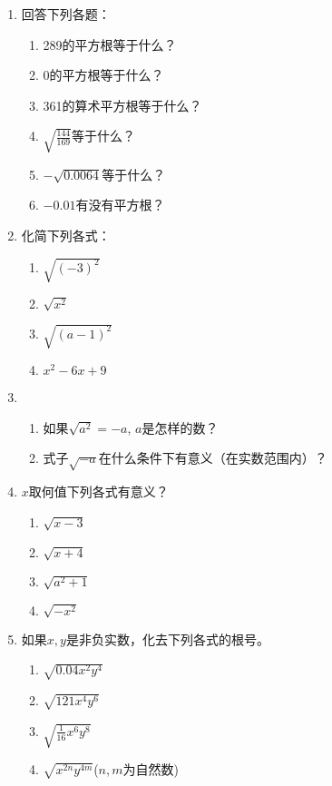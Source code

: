 \begin{ex}
\begin{enumerate}
    \item 回答下列各题：
    \begin{enumerate}
    \item 289的平方根等于什么？
    \item 0的平方根等于什么？
    \item 361的算术平方根等于什么？
    \item $\sqrt{\frac{144}{169}}$等于什么？
    \item $-\sqrt{0.0064}$等于什么？
    \item $-0.01$有没有平方根？
\end{enumerate}



\item 化简下列各式：
\begin{multicols}{2}
    \begin{enumerate}
    \item $\sqrt{(-3)^2}$
    \item $\sqrt{x^2}$
    \item $\sqrt{(a-1)^2}$
    \item $x^2-6x+9$
\end{enumerate}
\end{multicols}



\item 
\begin{enumerate}
    \item 如果$\sqrt{a^2}=-a$, $a$是怎样的数？
    \item 式子$\sqrt{-a}$在什么条件下有意义（在实数范围内）？
\end{enumerate}


\item $x$取何值下列各式有意义？
\begin{multicols}{2}
  \begin{enumerate}
    \item $\sqrt{x-3}$
    \item $\sqrt{x+4}$
    \item $\sqrt{a^2+1}$
    \item $\sqrt{-x^2}$
\end{enumerate}  
\end{multicols}


\item 如果$x,y$是非负实数，化去下列各式的根号。
\begin{enumerate}
    \item $\sqrt{0.04x^2y^4}$
    \item $\sqrt{121x^4y^6}$
    \item $\sqrt{\frac{1}{16}x^6y^8}$
    \item $\sqrt{x^{2n}y^{4m}}$\quad ($n,m$为自然数)
\end{enumerate}
\end{enumerate}
\end{ex}

